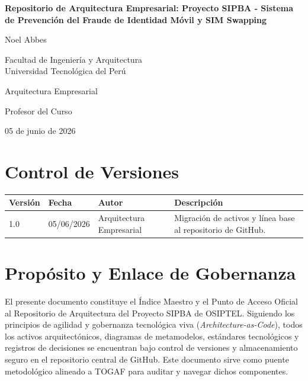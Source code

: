 \documentclass[12pt,a4paper]{article}
\begin{document}
\begin{titlepage}
    \centering
    \vspace*{2cm}
    {\Large \textbf{Repositorio de Arquitectura Empresarial: Proyecto SIPBA - Sistema de Prevención del Fraude de Identidad Móvil y SIM Swapping} \par}
    \vspace{2cm}
    {\large Noel Abbes \par}
    \vspace{1cm}
    {Facultad de Ingeniería y Arquitectura \\ Universidad Tecnológica del Perú \par} %
    \vspace{1cm}
    {Arquitectura Empresarial \par}
    \vspace{1cm}
    {Profesor del Curso \par}
    \vspace{1cm}
    {05 de junio de 2026 \par}
\end{titlepage}

\newpage
{}
\fancyhf{}
\rhead{\thepage}
\pagestyle{fancy}
\renewcommand{\headrulewidth}{0pt}

\section*{Control de Versiones}
\begin{table}[h]
    \centering
    \small
    \begin{tabularx}{\textwidth}{l l l X}
        \toprule
        \textbf{Versión} & \textbf{Fecha} & \textbf{Autor} & \textbf{Descripción} \\
        \midrule
        1.0 & 05/06/2026 & Arquitectura Empresarial & Migración de activos y línea base al repositorio de GitHub. \\
        \bottomrule
    \end{tabularx}
\end{table}

\vspace{0.5cm}

\section{Propósito y Enlace de Gobernanza}
El presente documento constituye el Índice Maestro y el Punto de Acceso Oficial al Repositorio de Arquitectura del Proyecto SIPBA de OSIPTEL. Siguiendo los principios de agilidad y gobernanza tecnológica viva (\textit{Architecture-as-Code}), todos los activos arquitectónicos, diagramas de metamodelos, estándares tecnológicos y registros de decisiones se encuentran bajo control de versiones y almacenamiento seguro en el repositorio central de GitHub. Este documento sirve como puente metodológico alineado a TOGAF para auditar y navegar dichos componentes.
\end{document}
